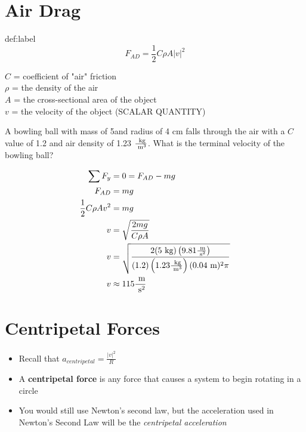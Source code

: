 \section{Air Drag}

\begin{definition}{def:label}
	$$
		F_{AD} = \frac{1}{2}C\rho A|v|^2
	$$

	$C$ = coefficient of "air" friction\\
	$\rho$ = the density of the air\\
	$A$ = the cross-sectional area of the object\\
	$v$ = the velocity of the object (SCALAR QUANTITY)
\end{definition}
\newpage


\begin{problem}
	A bowling ball with mass of 5\kg \text{ }and radius of 4 cm falls through the air with a $C$ value of 1.2 and air density of 1.23 $\frac{\text{ kg}}{\text{ m}^3}$. What is the terminal velocity of the bowling ball?

	$$
	\begin{aligned}
		\sum F_y &= 0 = F_{AD} - mg\\
		F_{AD} &= mg\\
		\frac{1}{2}C\rho Av^2 &= mg\\
		v &= \sqrt{\frac{2mg}{C\rho A}}\\
		v &= \sqrt{\frac{2(5\text{ kg})\left(9.81\frac{\text{ m}}{\text{ s}^2}\right)}{(1.2)\left(1.23 \frac{\text{ kg}}{\text{ m}^3}\right)(0.04\text{ m})^2\pi}}\\
		v &\approx 115 \frac{\text{ m}}{\text{ s}^2}
	\end{aligned}
	$$
\end{problem}


\section{Centripetal Forces}

\begin{itemize}
	\item Recall that $a_{centripetal} = \frac{|v|^2}{R}$
	\item A \textbf{centripetal force} is any force that causes a system to begin rotating in a circle
	\item You would still use Newton's second law, but the acceleration used in Newton's Second Law will be the \textit{centripetal acceleration}
\end{itemize}



